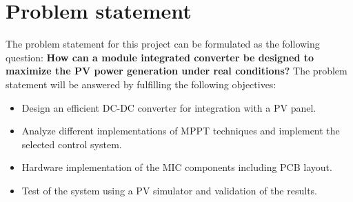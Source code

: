\section{Problem statement}

The problem statement for this project can be formulated as the following question: \newline
\textbf{How can a module integrated converter be designed to maximize the PV power generation under real conditions?}
\newline
\newline
The problem statement will be answered by fulfilling the following objectives: 

\begin{itemize}
	\item Design an efficient DC-DC converter for integration with a PV panel.
	\item Analyze different implementations of MPPT techniques and implement the selected control system. 
	\item Hardware implementation of the MIC components including PCB layout.
	\item Test of the system using a PV simulator and validation of the results. 
\end{itemize}
